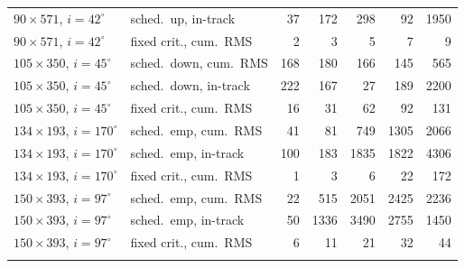 \begin{tabular}{@{}l l r r r r r @{}}
$90\times571$, $i=42^\circ$ & sched.\ up, in-track & 37 & 172 & 298 & 92 & 1950 \\
$90\times571$, $i=42^\circ$ & fixed crit., cum.\ RMS & 2 & 3 & 5 & 7 & 9 \\
\addlinespace[2pt]
$105\times350$, $i=45^\circ$ & sched.\ down, cum.\ RMS & 168 & 180 & 166 & 145 & 565 \\
$105\times350$, $i=45^\circ$ & sched.\ down, in-track & 222 & 167 & 27 & 189 & 2200 \\
$105\times350$, $i=45^\circ$ & fixed crit., cum.\ RMS & 16 & 31 & 62 & 92 & 131 \\
\addlinespace[2pt]
$134\times193$, $i=170^\circ$ & sched.\ emp, cum.\ RMS & 41 & 81 & 749 & 1305 & 2066 \\
$134\times193$, $i=170^\circ$ & sched.\ emp, in-track & 100 & 183 & 1835 & 1822 & 4306 \\
$134\times193$, $i=170^\circ$ & fixed crit., cum.\ RMS & 1 & 3 & 6 & 22 & 172 \\
\addlinespace[2pt]
$150\times393$, $i=97^\circ$ & sched.\ emp, cum.\ RMS & 22 & 515 & 2051 & 2425 & 2236 \\
$150\times393$, $i=97^\circ$ & sched.\ emp, in-track & 50 & 1336 & 3490 & 2755 & 1450 \\
$150\times393$, $i=97^\circ$ & fixed crit., cum.\ RMS & 6 & 11 & 21 & 32 & 44 \\
\addlinespace[2pt]
\bottomrule
\end{tabular}
